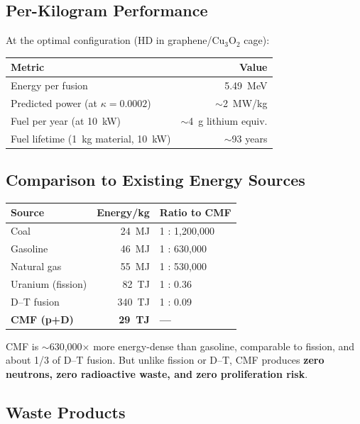 \documentclass[11pt, a4paper]{article}
\begin{document}
\subsection{Per-Kilogram Performance}

At the optimal configuration (HD in graphene/Cu$_3$O$_2$ cage):
\begin{center}
\begin{tabular}{@{}lr@{}}
\toprule
\textbf{Metric} & \textbf{Value} \\
\midrule
Energy per fusion & 5.49~MeV \\
Predicted power (at $\kappa = 0.0002$) & $\sim$2~MW/kg \\
Fuel per year (at 10~kW) & $\sim$4~g lithium equiv. \\
Fuel lifetime (1~kg material, 10~kW) & $\sim$93 years \\
\bottomrule
\end{tabular}
\end{center}

\subsection{Comparison to Existing Energy Sources}

\begin{center}
\begin{tabular}{@{}lrl@{}}
\toprule
\textbf{Source} & \textbf{Energy/kg} & \textbf{Ratio to CMF} \\
\midrule
Coal & 24~MJ & 1 : 1{,}200{,}000 \\
Gasoline & 46~MJ & 1 : 630{,}000 \\
Natural gas & 55~MJ & 1 : 530{,}000 \\
Uranium (fission) & 82~TJ & 1 : 0.36 \\
D--T fusion & 340~TJ & 1 : 0.09 \\
\textbf{CMF (p+D)} & \textbf{29~TJ} & \textbf{---} \\
\bottomrule
\end{tabular}
\end{center}

CMF is $\sim$630{,}000$\times$ more energy-dense than gasoline,
comparable to fission, and about 1/3 of D--T fusion. But unlike
fission or D--T, CMF produces \textbf{zero neutrons, zero
radioactive waste, and zero proliferation risk}.

\subsection{Waste Products}
\end{document}
